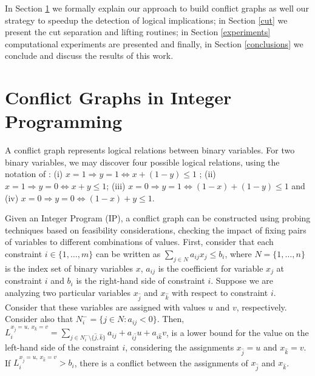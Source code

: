 \documentclass{endm}
\begin{document}
In Section \ref{seccgraph} we formally explain our approach to build conflict graphs as well our strategy to speedup the detection of logical implications; in Section \ref{cut} we present the cut separation and lifting routines; in Section \ref{experiments} computational experiments are presented and finally, in Section \ref{conclusions} we conclude and discuss the results of this work.

\section{Conflict Graphs in Integer Programming}\label{seccgraph}

A conflict graph represents logical relations between binary variables. For two binary variables, we may discover four possible logical relations, using the notation of \cite{atamturk}: (i) $x = 1 \Rightarrow y = 1 \Longleftrightarrow x + (1 - y)  \leq 1$ ; (ii) $x=1 \Rightarrow y = 0 \Longleftrightarrow x + y \leq 1$; (iii) $x = 0 \Rightarrow y = 1 \Longleftrightarrow  (1 - x) + (1 - y) \leq 1$ and (iv) $x = 0 \Rightarrow y = 0 \Longleftrightarrow (1 - x) + y \leq 1$.

Given an Integer Program (IP), a conflict graph can be constructed using probing techniques based on feasibility considerations\cite{achterberg,atamturk}, checking the impact of fixing pairs of variables to different combinations of values. First, consider that each constraint $i \in \{1,\ldots,m\}$ can be written as $\displaystyle \sum_{j \in N} a_{ij}x_{j} \leq b_{i}$, where $N=\{1,\ldots,n\}$ is the index set of binary variables $x$, $a_{ij}$ is the coefficient for variable $x_{j}$ at constraint $i$ and $b_{i}$ is the right-hand side of constraint $i$. Suppose we are analyzing two particular variables $x_{\hat{j}}$ and $x_{\hat{k}}$ with respect to constraint $i$. Consider that these variables are assigned with values $u$ and $v$, respectively. Consider also that $N_{i}^{-} = \{j \in N : a_{ij} < 0\}$. Then, $\displaystyle
L_{i}^{x_{\hat{j}} = u,\, x_{\hat{k}} = v}=\sum_{j\in N_{i}^{-} \setminus \{\hat{j}, \hat{k}\}}a_{ij}+a_{i\hat{j}}u+a_{i\hat{k}}v $, is a lower bound for the value on the left-hand side  of the constraint $i$, considering the assignments $x_{\hat{j}} = u$ and $x_{\hat{k}} = v$. If $L_{i}^{x_{\hat{j}} = u,\, x_{\hat{k}} = v} > b_{i}$, there is a conflict between the assignments of $x_{\hat{j}}$ and $x_{\hat{k}}$. 
\end{document}
